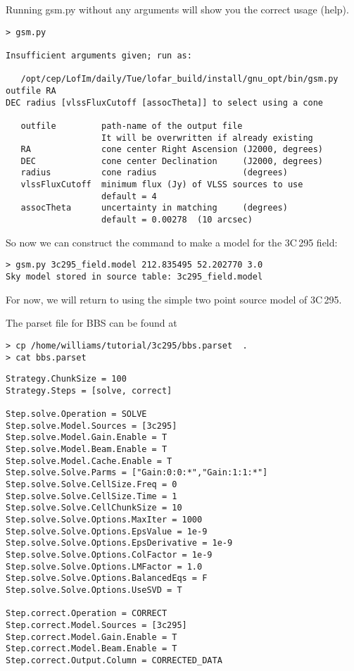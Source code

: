 Running gsm.py without any arguments will show you the correct usage (help).
\begin{verbatim}
> gsm.py 

Insufficient arguments given; run as:

   /opt/cep/LofIm/daily/Tue/lofar_build/install/gnu_opt/bin/gsm.py outfile RA
DEC radius [vlssFluxCutoff [assocTheta]] to select using a cone

   outfile         path-name of the output file
                   It will be overwritten if already existing
   RA              cone center Right Ascension (J2000, degrees)
   DEC             cone center Declination     (J2000, degrees)
   radius          cone radius                 (degrees)
   vlssFluxCutoff  minimum flux (Jy) of VLSS sources to use
                   default = 4
   assocTheta      uncertainty in matching     (degrees)
                   default = 0.00278  (10 arcsec)
\end{verbatim}

So now we can construct the command to make a model for the 3C\,295 field:
\begin{verbatim}
> gsm.py 3c295_field.model 212.835495 52.202770 3.0
Sky model stored in source table: 3c295_field.model
\end{verbatim}

For now, we will return to using the simple two point source model of 3C\,295.




The parset file for BBS can be found at
\begin{verbatim}
> cp /home/williams/tutorial/3c295/bbs.parset  .
> cat bbs.parset
\end{verbatim}
\begin{lstlisting}
Strategy.ChunkSize = 100
Strategy.Steps = [solve, correct]

Step.solve.Operation = SOLVE
Step.solve.Model.Sources = [3c295]
Step.solve.Model.Gain.Enable = T
Step.solve.Model.Beam.Enable = T
Step.solve.Model.Cache.Enable = T
Step.solve.Solve.Parms = ["Gain:0:0:*","Gain:1:1:*"]
Step.solve.Solve.CellSize.Freq = 0
Step.solve.Solve.CellSize.Time = 1
Step.solve.Solve.CellChunkSize = 10
Step.solve.Solve.Options.MaxIter = 1000
Step.solve.Solve.Options.EpsValue = 1e-9
Step.solve.Solve.Options.EpsDerivative = 1e-9
Step.solve.Solve.Options.ColFactor = 1e-9
Step.solve.Solve.Options.LMFactor = 1.0
Step.solve.Solve.Options.BalancedEqs = F
Step.solve.Solve.Options.UseSVD = T

Step.correct.Operation = CORRECT
Step.correct.Model.Sources = [3c295]
Step.correct.Model.Gain.Enable = T
Step.correct.Model.Beam.Enable = T
Step.correct.Output.Column = CORRECTED_DATA
\end{lstlisting}

